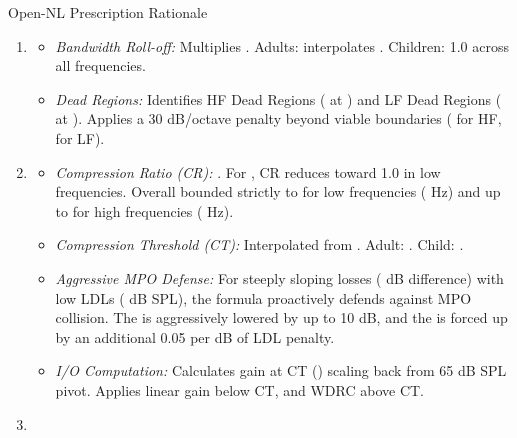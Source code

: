 \documentclass[letterpaper]{book}
\begin{document}
\begin{Section}{Open-NL Prescription Rationale}
\begin{enumerate}
\begin{itemize}
\end{itemize}

\item{} 
\begin{itemize}

\item{} \emph{Bandwidth Roll-off:} Multiplies . Adults: interpolates . Children: 1.0 across all frequencies.
\item{} \emph{Dead Regions:} Identifies HF Dead Regions ( at ) and LF Dead Regions ( at ). Applies a 30 dB/octave penalty beyond viable boundaries ( for HF,  for LF).

\end{itemize}

\item{} 
\begin{itemize}

\item{} \emph{Compression Ratio (CR):} . For , CR reduces toward 1.0 in low frequencies. Overall bounded strictly to  for low frequencies ( Hz) and up to  for high frequencies ( Hz).
\item{} \emph{Compression Threshold (CT):} Interpolated from . Adult: . Child: .
\item{} \emph{Aggressive MPO Defense:} For steeply sloping losses ( dB difference) with low LDLs ( dB SPL), the formula proactively defends against MPO collision. The  is aggressively lowered by up to 10 dB, and the  is forced up by an additional 0.05 per dB of LDL penalty.
\item{} \emph{I/O Computation:} Calculates gain at CT () scaling back from 65 dB SPL pivot. Applies linear gain below CT, and WDRC above CT.

\end{itemize}

\item{} 
\begin{itemize}


\end{itemize}
\end{enumerate}
\end{Section}
\end{document}
